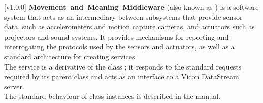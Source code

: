 [v1.0.0]
\textbf{Movement~and~Meaning~Middleware} (also known as \mplusm) is a software system
that acts as an intermediary between subsystems that provide sensor data, such as
accelerometers and motion capture cameras, and actuators such as projectors and sound
systems.
It provides mechanisms for reporting and interrogating the protocols used by the sensors
and actuators, as well as a standard architecture for creating services.\\

The \VDSI{} service is a derivative of the \mplusm{} class ;
it responds to the standard requests required by its parent class and acts as an interface
to a Vicon DataStream server.\\

The standard behaviour of  class instances is described in
the \emph{\MMM} manual.
\primaryEnd{}
